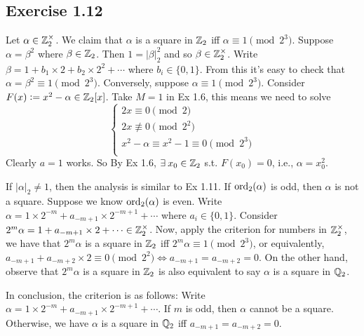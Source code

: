 \documentclass[../Koblitz.tex]{subfiles}
\begin{document}
\subsection*{Exercise 1.12}

Let $\alpha\in\mathbb{Z}_2^\times$. We claim that $\alpha$ is a square in $\mathbb{Z}_2$ iff
$\alpha\equiv 1\pmod{2^3}$. Suppose $\alpha=\beta^2$ where $\beta\in\mathbb{Z}_2$. Then $1=|\beta|_2^2$ and so $\beta\in\mathbb{Z}_2^\times$. Write $\beta=1+b_1\times2+b_2\times2^2+\cdots$ where $b_i\in\{0,1\}$. From this it's easy to check that $\alpha=\beta^2\equiv 1\pmod{2^3}$. Conversely, suppose $\alpha\equiv1\pmod{2^3}$. Consider $F(x):=x^2-\alpha\in\mathbb{Z}_2[x]$. Take $M=1$ in Ex 1.6, this means we need to solve
$$
\begin{cases*}
2x \equiv0\pmod{2} \\
2x \not\equiv0\pmod{2^2} \\
x^2-\alpha \equiv x^2-1 \equiv0 \pmod{2^3} \\
\end{cases*}
$$
Clearly $a=1$ works. So By Ex 1.6, $\exists x_0\in\ZZ_2$ s.t. $F(x_0)=0$, i.e., $\alpha=x_0^2$.

If $|\alpha|_2\neq 1$, then the analysis is similar to Ex 1.11. If $\operatorname{ord}_2(\alpha)$ is odd, then $\alpha$ is not a square. Suppose we know $\operatorname{ord}_2(\alpha)$ is even. Write $\alpha=1\times2^{-m}+a_{-m+1}\times2^{-m+1}+\cdots$ where $a_i\in\{0,1\}$. Consider $2^m\alpha =1+a_{-m+1}\times2+\cdots \in\mathbb{Z}_2^\times$. Now, apply the criterion for numbers in $\mathbb{Z}_2^\times$, we have that $2^m\alpha$ is a square in $\mathbb{Z}_2$ iff $2^m\alpha\equiv 1 \pmod{2^3}$, or equivalently, $a_{-m+1}+a_{-m+2}\times2\equiv0\pmod{2^2} \iff a_{-m+1}=a_{-m+2}=0$. On the other hand, observe that $2^m\alpha$ is a square in $\mathbb{Z}_2$ is also equivalent to say $\alpha$ is a square in $\mathbb{Q}_2$.

In conclusion, the criterion is as follows: Write $\alpha=1\times2^{-m}+a_{-m+1}\times2^{-m+1}+\cdots$. If $m$ is odd, then $\alpha$ cannot be a square. Otherwise, we have $\alpha$ is a square in $\mathbb{Q}_2$ iff $a_{-m+1}=a_{-m+2}=0$.
\end{document}
